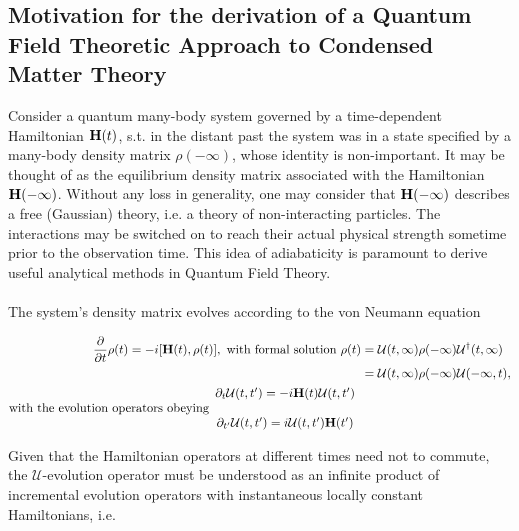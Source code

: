 \subsection{Motivation for the derivation of a Quantum Field Theoretic Approach to Condensed Matter Theory} \medbreak

Consider a quantum many-body system governed by a time-dependent Hamiltonian ${\bf H}(t)$, s.t. in the distant past the system was in a state specified by a many-body density matrix $\rho(-\infty)$, whose identity is non-important. 
It may be thought of as the equilibrium density matrix associated with the Hamiltonian ${\bf H}(-\infty)$. Without any loss in generality, one may consider that ${\bf H}(-\infty)$ describes a free (Gaussian) theory, i.e. a theory of non-interacting particles. 
The interactions may be  switched on to reach their actual physical strength sometime prior to the observation time. 
This idea of adiabaticity is paramount to derive useful analytical methods in Quantum Field Theory. \bigbreak

\paragraph{}

The system's density matrix evolves according to the von Neumann equation 

\begin{equation}
\begin{split}
    \frac{\partial}{\partial t} \rho(t) = -i [{\bf H}(t), \rho(t)], \textnormal{ with formal solution } \rho(t) &= \mathcal{U}(t, \infty) \rho(-\infty) \mathcal{U}^\dagger(t, \infty) \\ 
    &= \mathcal{U}(t, \infty) \rho(-\infty) \mathcal{U}(-\infty, t), \\
    \textnormal{with the evolution operators obeying} \begin{array}{cc}
         \partial_t \mathcal{U}(t,t') = - i {\bf H}(t) \mathcal{U}(t,t') \\
         \\
         \partial_{t'} \mathcal{U}(t,t') = i  \mathcal{U}(t,t') {\bf H}(t')
    \end{array}
\end{split}
\end{equation}

Given that the Hamiltonian operators at different times need not to commute, the $\mathcal{U}$-evolution operator must be understood as an infinite product of incremental evolution operators with instantaneous locally constant Hamiltonians, i.e.

